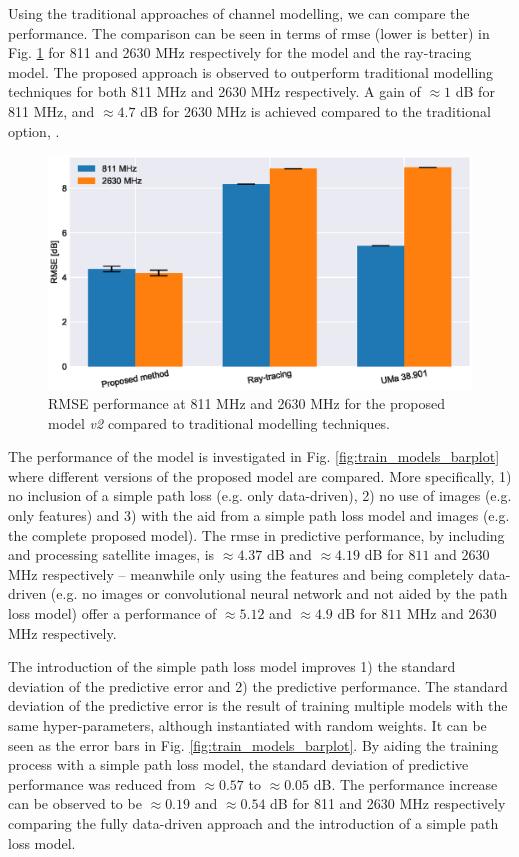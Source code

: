 Using the traditional approaches of channel modelling, we can compare the performance. The comparison can be seen in terms of \gls{rmse} (lower is better) in Fig. \ref{fig:model_comparison_bar_group} for 811 and 2630 MHz respectively for the  model and the ray-tracing model. The proposed approach is observed to outperform traditional modelling techniques for both 811 MHz and 2630 MHz respectively. A gain of $\approx 1$ dB for 811 MHz, and $\approx 4.7$ dB for 2630 MHz is achieved compared to the traditional option, . 


\begin{figure}
    \centering
    \includegraphics{chapters/part_pathloss/model_aided_paper/model_comparison_bar_group_std_split.eps}
    \caption{RMSE performance at 811 MHz and 2630 MHz for the proposed model \emph{v2} compared to traditional modelling techniques.}
    \label{fig:model_comparison_bar_group}
\end{figure}

The performance of the model is investigated in Fig. \ref{fig:train_models_barplot} where different versions of the proposed model are compared. More specifically, 1) no inclusion of a simple path loss (e.g. only data-driven), 2) no use of images (e.g. only features) and 3) with the aid from a simple path loss model and images (e.g. the complete proposed model). The \gls{rmse} in predictive performance, by including and processing satellite images, is  $\approx 4.37$ dB and $\approx 4.19 $ dB for $811$ and $2630$ MHz respectively  -- meanwhile only using the features and being completely data-driven (e.g. no images or convolutional neural network and not aided by the path loss model) offer a performance of $\approx 5.12$ and $\approx 4.9$ dB for $811$ MHz and $2630$ MHz respectively. 

The introduction of the simple path loss model improves 1) the standard deviation of the predictive error and 2) the predictive performance. The standard deviation of the predictive error is the result of training multiple models with the same hyper-parameters, although instantiated with random weights. It can be seen as the error bars in Fig. \ref{fig:train_models_barplot}. By aiding the training process with a simple path loss model, the standard deviation of predictive performance was reduced from $\approx 0.57$ to $\approx 0.05$ dB. The performance increase can be observed to be $\approx 0.19$ and $\approx 0.54$ dB for 811 and 2630 MHz respectively comparing the fully data-driven approach and the introduction of a simple path loss model. 


